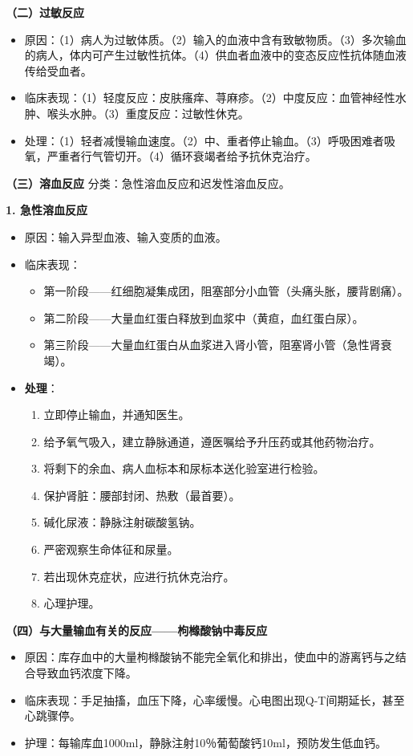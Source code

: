 \documentclass[11pt, a4paper]{ctexart}
\begin{document}
\textbf{（二）过敏反应}
\begin{itemize}
    \item 原因：（1）病人为过敏体质。（2）输入的血液中含有致敏物质。（3）多次输血的病人，体内可产生过敏性抗体。（4）供血者血液中的变态反应性抗体随血液传给受血者。
    \item 临床表现：（1）轻度反应：皮肤瘙痒、荨麻疹。（2）中度反应：血管神经性水肿、喉头水肿。（3）重度反应：过敏性休克。
    \item 处理：（1）轻者减慢输血速度。（2）中、重者停止输血。（3）呼吸困难者吸氧，严重者行气管切开。（4）循环衰竭者给予抗休克治疗。
\end{itemize}

\textbf{（三）溶血反应}
分类：急性溶血反应和迟发性溶血反应。

\textbf{1. 急性溶血反应}
\begin{itemize}
    \item 原因：输入异型血液、输入变质的血液。
    \item 临床表现：
    \begin{itemize}
        \item 第一阶段——红细胞凝集成团，阻塞部分小血管（头痛头胀，腰背剧痛）。
        \item 第二阶段——大量血红蛋白释放到血浆中（黄疸，血红蛋白尿）。
        \item 第三阶段——大量血红蛋白从血浆进入肾小管，阻塞肾小管（急性肾衰竭）。
    \end{itemize}
    \item \textbf{处理}：
    \begin{enumerate}
        \item 立即停止输血，并通知医生。
        \item 给予氧气吸入，建立静脉通道，遵医嘱给予升压药或其他药物治疗。
        \item 将剩下的余血、病人血标本和尿标本送化验室进行检验。
        \item 保护肾脏：腰部封闭、热敷（最首要）。
        \item 碱化尿液：静脉注射碳酸氢钠。
        \item 严密观察生命体征和尿量。
        \item 若出现休克症状，应进行抗休克治疗。
        \item 心理护理。
    \end{enumerate}
\end{itemize}

\textbf{（四）与大量输血有关的反应——枸橼酸钠中毒反应}
\begin{itemize}
    \item 原因：库存血中的大量枸橼酸钠不能完全氧化和排出，使血中的游离钙与之结合导致血钙浓度下降。
    \item 临床表现：手足抽搐，血压下降，心率缓慢。心电图出现Q-T间期延长，甚至心跳骤停。
    \item 护理：每输库血1000ml，静脉注射10％葡萄酸钙10ml，预防发生低血钙。
\end{itemize}
\end{document}
